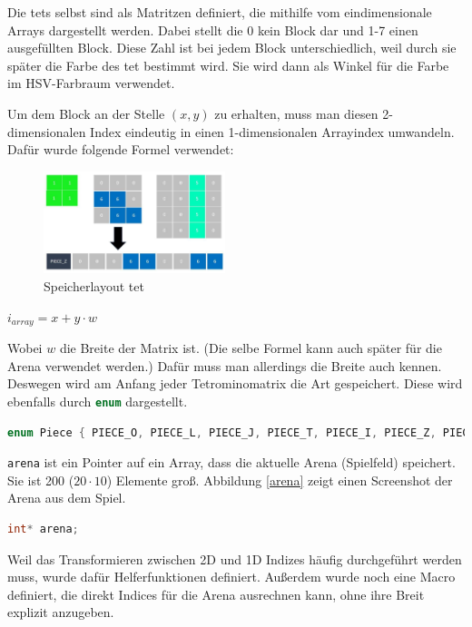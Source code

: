 \documentclass[11pt]{article}
\newcommand{\lstin}[1]{\lstinline[language=C]{#1}}
\begin{document}
Die \glspl{tet} selbst sind als Matritzen definiert, die mithilfe vom eindimensionale Arrays dargestellt werden. Dabei stellt die 0 kein Block dar und 1-7 einen ausgefüllten Block.
Diese Zahl ist bei jedem Block unterschiedlich, weil durch sie später die Farbe des \gls{tet} bestimmt wird. Sie wird dann als Winkel für die Farbe im HSV-Farbraum verwendet.

Um dem Block an der Stelle $(x, y)$ zu erhalten, muss man diesen 2-dimensionalen Index eindeutig in einen 1-dimensionalen Arrayindex umwandeln. Dafür wurde folgende Formel verwendet:

\begin{figure}[h]
  \centering
  \includegraphics[width=200px]{../images/mem_layout.jpg}
  \caption{Speicherlayout \gls{tet}}
\end{figure}

\begin{center}
  \begin{math}
    i_{array} = x + y \cdot w
  \end{math}
\end{center}

Wobei $w$ die Breite der Matrix ist. (Die selbe Formel kann auch später für die Arena verwendet werden.)
Dafür muss man allerdings die Breite auch kennen. Deswegen wird am Anfang jeder Tetrominomatrix die Art gespeichert. Diese wird ebenfalls durch \lstin{enum} dargestellt.

\begin{lstlisting}[language=C]
enum Piece { PIECE_O, PIECE_L, PIECE_J, PIECE_T, PIECE_I, PIECE_Z, PIECE_S };
\end{lstlisting}

\lstin{arena} ist ein Pointer auf ein Array, dass die aktuelle Arena (Spielfeld) speichert. Sie ist 200 ($20 \cdot 10$) Elemente groß.
Abbildung \ref{arena} zeigt einen Screenshot der Arena aus dem Spiel.
\begin{lstlisting}[language=C]
int* arena;  
\end{lstlisting}

Weil das Transformieren zwischen 2D und 1D Indizes häufig durchgeführt werden muss, wurde dafür Helferfunktionen definiert. 
Außerdem wurde noch eine Macro definiert, die direkt Indices für die Arena ausrechnen kann, ohne ihre Breit explizit anzugeben.
\end{document}
